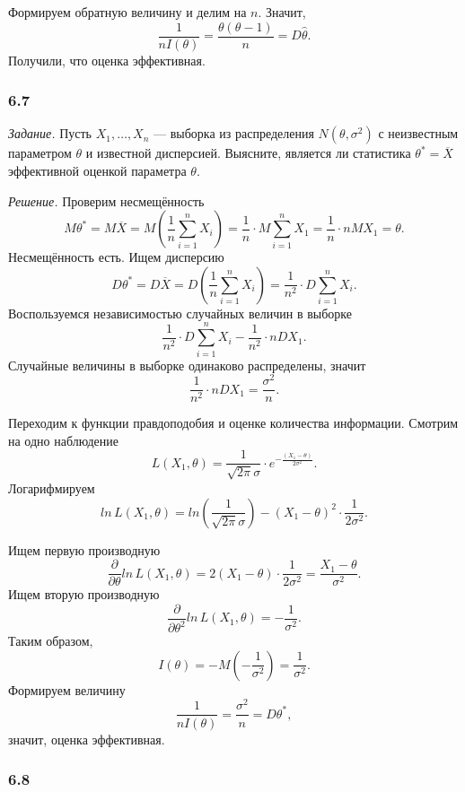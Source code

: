 Формируем обратную величину и делим на $n$.
Значит,
$$ \frac{1}{nI \left( \theta \right) } =
  \frac{ \theta \left( \theta - 1 \right) }{n} =
  D \hat{ \theta }.$$
Получили, что оценка эффективная.

\subsubsection*{6.7}

\textit{Задание.}
Пусть $X_1, \dotsc, X_n$ ---
выборка из распределения $N \left( \theta, \sigma^2 \right) $ с неизвестным параметром $ \theta $
и известной дисперсией.
Выясните,
является ли статистика $ \theta^* = \overline{X}$ эффективной оценкой параметра $ \theta $.

\textit{Решение.} Проверим несмещённость
$$M \theta^* =
  M \overline{X} =
  M \left( \frac{1}{n} \sum \limits_{i = 1}^n X_i \right) =
  \frac{1}{n} \cdot M \sum \limits_{i = 1}^n X_1 =
  \frac{1}{n} \cdot nMX_1 =
  \theta.$$
Несмещённость есть.
Ищем дисперсию
$$D \theta^* =
  D \overline{X} =
  D \left( \frac{1}{n} \sum \limits_{i = 1}^n X_i \right) =
  \frac{1}{n^2} \cdot D \sum \limits_{i = 1}^n X_i.$$
Воспользуемся независимостью случайных величин в выборке
$$ \frac{1}{n^2} \cdot D \sum \limits_{i = 1}^n X_i -
  \frac{1}{n^2} \cdot nDX_1.$$
Случайные величины в выборке одинаково распределены, значит
$$ \frac{1}{n^2} \cdot nDX_1 =
  \frac{ \sigma^2}{n}.$$

Переходим к функции правдоподобия и оценке количества информации.
Смотрим на одно наблюдение
$$L \left( X_1, \theta \right) =
  \frac{1}{ \sqrt{2 \pi } \sigma } \cdot e^{- \frac{ \left( X_1 - \theta \right) }{2 \sigma^2}}.$$
Логарифмируем
$$ln \, L \left( X_1, \theta \right) =
  ln \left( \frac{1}{ \sqrt{2 \pi } \sigma } \right) -
  \left( X_1 - \theta \right)^2 \cdot \frac{1}{2 \sigma^2}.$$

Ищем первую производную
$$ \frac{ \partial }{ \partial \theta } ln \, L \left( X_1, \theta \right) =
  2 \left( X_1 - \theta \right) \cdot \frac{1}{2 \sigma^2} =
  \frac{X_1 - \theta }{ \sigma^2}.$$
Ищем вторую производную
$$ \frac{ \partial }{ \partial \theta^2} ln \, L \left( X_1, \theta \right) =
  - \frac{1}{ \sigma^2}.$$
Таким образом,
$$I \left( \theta \right) =
  -M \left( - \frac{1}{ \sigma^2} \right) =
  \frac{1}{ \sigma^2}.$$
Формируем величину
$$ \frac{1}{nI \left( \theta \right) } =
  \frac{ \sigma^2}{n} =
  D \theta^*,$$
значит, оценка эффективная.

\subsubsection*{6.8}

